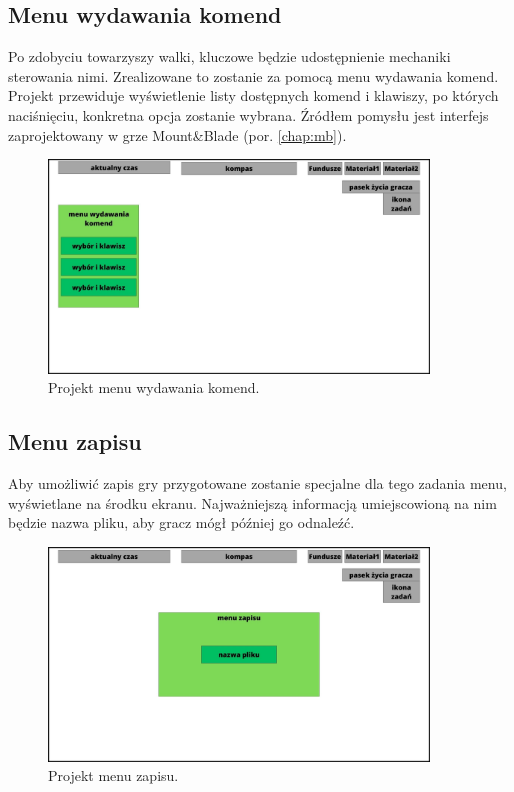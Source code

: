 \subsection{Menu wydawania komend}
Po zdobyciu towarzyszy walki, kluczowe będzie udostępnienie mechaniki sterowania nimi. Zrealizowane to zostanie za pomocą menu wydawania komend.
Projekt przewiduje wyświetlenie listy dostępnych komend i klawiszy, po których naciśnięciu, konkretna opcja zostanie wybrana. 
Źródłem pomysłu jest interfejs zaprojektowany w grze Mount\&Blade (por. \ref{chap:mb}).

\begin{figure}[htbp]
    \centering
    \includegraphics[width=0.9\textwidth]{images/ui/ui_proj_walka.jpg}
    \caption{Projekt menu wydawania komend.}\label{fig:cmd_menu}
\end{figure}

\subsection{Menu zapisu}
Aby umożliwić zapis gry przygotowane zostanie specjalne dla tego zadania menu, wyświetlane na środku ekranu. Najważniejszą informacją 
umiejscowioną na nim będzie nazwa pliku, aby gracz mógł później go odnaleźć.
\begin{figure}[htbp]
    \centering
    \includegraphics[width=0.9\textwidth]{images/ui/ui_proj_zapis.jpg}
    \caption{Projekt menu zapisu.}\label{fig:men_zap}
\end{figure}

